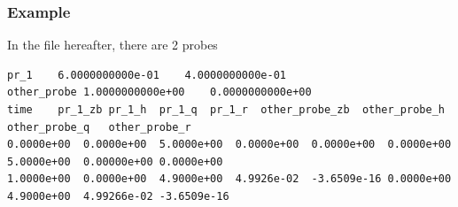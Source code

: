 \subsubsection{Example}
In the file hereafter, there are 2 probes
\begin{small}
\begin{verbatim}
pr_1	6.0000000000e-01	4.0000000000e-01
other_probe	1.0000000000e+00	0.0000000000e+00
time	pr_1_zb	pr_1_h	pr_1_q	pr_1_r 	other_probe_zb 	other_probe_h	other_probe_q	other_probe_r
0.0000e+00	0.0000e+00	5.0000e+00	0.0000e+00	0.0000e+00	0.0000e+00	5.0000e+00	0.00000e+00	0.0000e+00
1.0000e+00	0.0000e+00	4.9000e+00	4.9926e-02	-3.6509e-16	0.0000e+00	4.9000e+00	4.99266e-02	-3.6509e-16	
\end{verbatim}
\end{small}